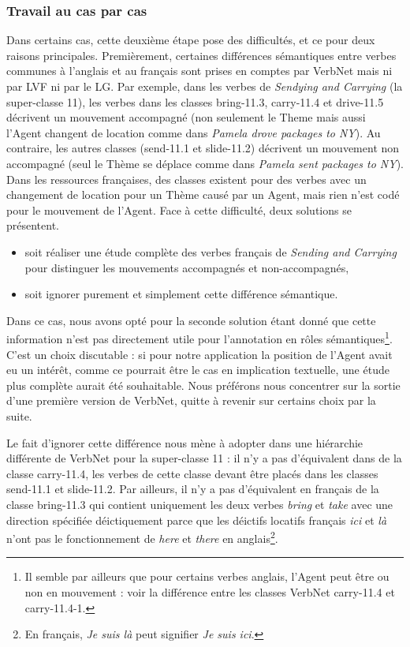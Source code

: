 \subsubsection{Travail au cas par cas}\label{subsubsec:casebycase}

Dans certains cas, cette deuxième étape pose des difficultés, et ce pour deux
raisons principales. Premièrement, certaines différences sémantiques entre
verbes communes à l'anglais et au français sont prises en comptes par VerbNet
mais ni par LVF ni par le LG. Par exemple, dans les verbes de \emph{Sendying
and Carrying} (la super-classe 11), les verbes dans les classes
{\color{blue}bring-11.3}, {\color{blue}carry-11.4} et {\color{blue}drive-11.5}
décrivent un mouvement accompagné (non seulement le Theme mais aussi l'Agent
changent de location comme dans \emph{Pamela drove packages to NY}). Au
contraire, les autres classes ({\color{blue}send-11.1} et
{\color{blue}slide-11.2}) décrivent un mouvement non accompagné (seul le Thème
se déplace comme dans \emph{Pamela sent packages to NY}). Dans les ressources
françaises, des classes existent pour des verbes avec un changement de location
pour un Thème causé par un Agent, mais rien n'est codé pour le mouvement de
l'Agent. Face à cette difficulté, deux solutions se présentent.

\begin{itemize}
    \item soit réaliser une étude complète des verbes français de \emph{Sending
        and Carrying} pour distinguer les mouvements accompagnés et
        non-accompagnés,
    \item soit ignorer purement et simplement cette différence sémantique.
\end{itemize}

Dans ce cas, nous avons opté pour la seconde solution étant donné que cette
information n'est pas directement utile pour l'annotation en rôles
sémantiques\footnote{Il semble par ailleurs que pour certains verbes anglais,
    l'Agent peut être ou non en mouvement : voir la différence entre les
classes VerbNet {\color{blue}carry-11.4} et {\color{blue}carry-11.4-1}.}.
C'est un choix discutable : si pour notre application la position de l'Agent
avait eu un intérêt, comme ce pourrait être le cas en implication textuelle,
une étude plus complète aurait été souhaitable. Nous préférons nous concentrer
sur la sortie d'une première version de VerbNet, quitte à revenir sur certains
choix par la suite.

Le fait d'ignorer cette différence nous mène à adopter dans \verbenet{} une
hiérarchie différente de VerbNet pour la super-classe 11 : il n'y a pas
d'équivalent dans \verbenet{} de la classe {\color{blue}carry-11.4}, les verbes
de cette classe devant être placés dans les classes {\color{blue}send-11.1} et
{\color{blue}slide-11.2}. Par ailleurs, il n'y a pas d'équivalent en français
de la classe {\color{blue}bring-11.3} qui contient uniquement les deux verbes
\emph{bring} et \emph{take} avec une direction spécifiée déictiquement
\citep[page 135]{levin1993english} parce que les déictifs locatifs français
\emph{ici} et \emph{là} n'ont pas le fonctionnement de \emph{here} et
\emph{there} en anglais\footnote{En français, \emph{Je suis là} peut signifier
\emph{Je suis ici}.}.

